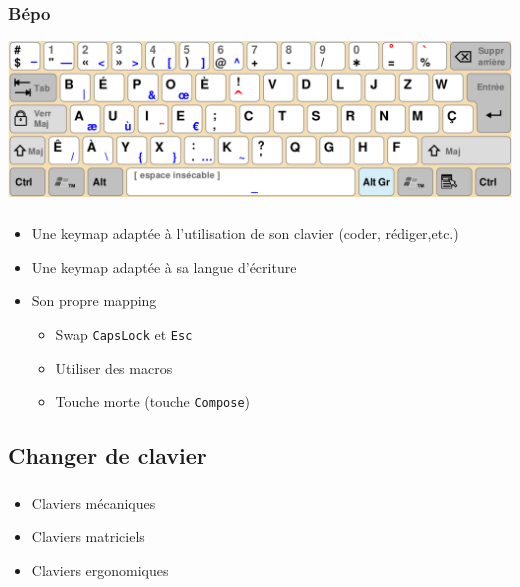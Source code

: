 \documentclass[c,12pt]{beamer}
\begin{document}
\begin{frame}
	\frametitle{Bépo}
	\begin{center}
		\includegraphics[scale=0.26]{Bepo.png}
	\end{center}
\end{frame}

\begin{frame}
	\frametitle{\subsecname}
	\begin{itemize}
		\item{Une keymap adaptée à l'utilisation de son clavier (coder,
			rédiger,etc.)}
		\item<1->{Une keymap adaptée à sa langue d'écriture}
		\item<2->{Son propre mapping}
			\begin{itemize}
				\item<3->{Swap \texttt{CapsLock} et \texttt{Esc}}
				\item<4->{Utiliser des macros}
				\item<5->{Touche morte (touche \texttt{Compose})}
			\end{itemize}
	\end{itemize}
\end{frame}

\subsection{Changer de clavier}

\begin{frame}
	\frametitle{\subsecname}
	\begin{itemize}
		\item<2->{Claviers mécaniques}
		\item<3->{Claviers matriciels}
		\item<4->{Claviers ergonomiques}
	\end{itemize}
\end{frame}
\end{document}
